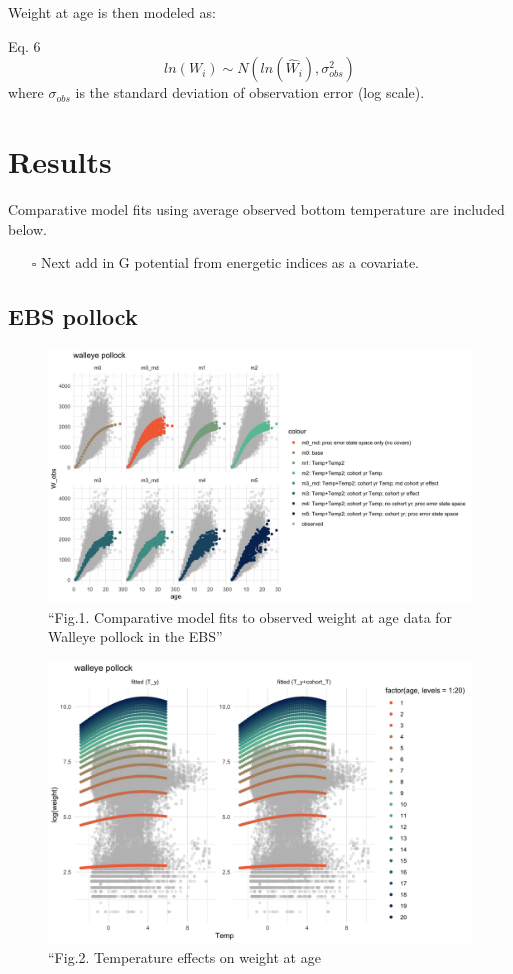 \documentclass[
]{article}
\providecommand{\tightlist}{%
  \setlength{\itemsep}{0pt}\setlength{\parskip}{0pt}}
\begin{document}
Weight at age is then modeled as:

Eq. 6 \[ ln({W}_i) \sim N(ln(\hat{W}_i),\sigma^2_{obs})\] where
\(\sigma_{obs}\) is the standard deviation of observation error (log
scale).

\section{Results}\label{results}

Comparative model fits using average observed bottom temperature are
included below.

\begin{itemize}
\tightlist
\item[$\square$]
  Next add in G potential from energetic indices as a covariate.
\end{itemize}

\subsection{EBS pollock}\label{ebs-pollock}

\begin{figure}
\centering
\includegraphics{Figs/model_plots.jpg}
\caption{``Fig.1. Comparative model fits to observed weight at age data
for Walleye pollock in the EBS''}
\end{figure}

\begin{figure}
\centering
\includegraphics{Figs/model_Temp_byage2.jpg}
\caption{``Fig.2. Temperature effects on weight at age}
\end{figure}
\end{document}
